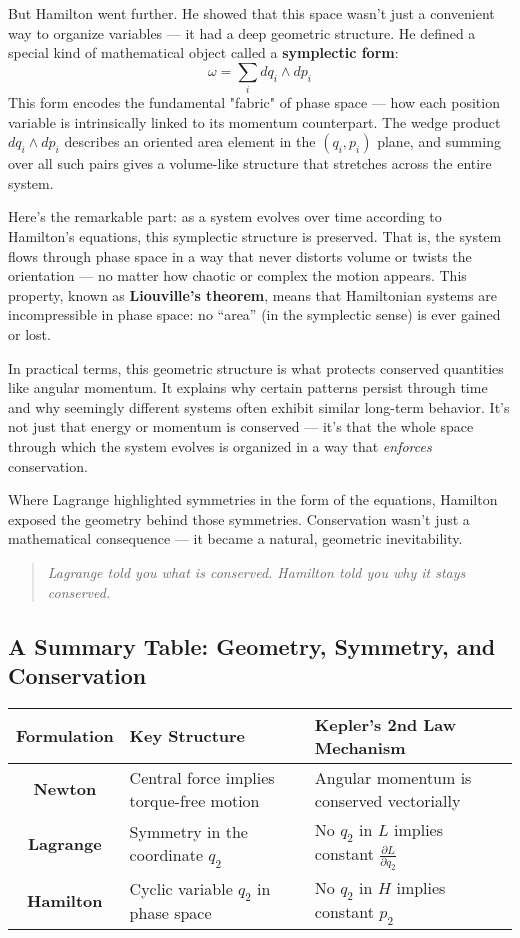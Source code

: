 But Hamilton went further. He showed that this space wasn’t just a convenient way to organize variables — it had a deep geometric structure. He defined a special kind of mathematical object called a \textbf{symplectic form}:
\[
\omega = \sum_i dq_i \wedge dp_i
\]
This form encodes the fundamental "fabric" of phase space — how each position variable is intrinsically linked to its momentum counterpart. The wedge product \( dq_i \wedge dp_i \) describes an oriented area element in the \( (q_i, p_i) \) plane, and summing over all such pairs gives a volume-like structure that stretches across the entire system.

Here’s the remarkable part: as a system evolves over time according to Hamilton’s equations, this symplectic structure is preserved. That is, the system flows through phase space in a way that never distorts volume or twists the orientation — no matter how chaotic or complex the motion appears. This property, known as \textbf{Liouville’s theorem}, means that Hamiltonian systems are incompressible in phase space: no “area” (in the symplectic sense) is ever gained or lost.

In practical terms, this geometric structure is what protects conserved quantities like angular momentum. It explains why certain patterns persist through time and why seemingly different systems often exhibit similar long-term behavior. It’s not just that energy or momentum is conserved — it’s that the whole space through which the system evolves is organized in a way that \textit{enforces} conservation.

Where Lagrange highlighted symmetries in the form of the equations, Hamilton exposed the geometry behind those symmetries. Conservation wasn’t just a mathematical consequence — it became a natural, geometric inevitability.

\begin{quote}
\textit{Lagrange told you what is conserved. Hamilton told you why it stays conserved.}
\end{quote}


\subsection{A Summary Table: Geometry, Symmetry, and Conservation}

\begin{center}
\renewcommand{\arraystretch}{1.5}
\begin{tabular}{|c|l|l|}
\hline
\textbf{Formulation} & \textbf{Key Structure} & \textbf{Kepler’s 2nd Law Mechanism} \\ \hline
\textbf{Newton} & Central force implies torque-free motion & Angular momentum is conserved vectorially \\ \hline
\textbf{Lagrange} & Symmetry in the coordinate \( q_2 \) & No \( q_2 \) in \( L \) implies constant \( \frac{\partial L}{\partial \dot{q}_2} \) \\ \hline
\textbf{Hamilton} & Cyclic variable \( q_2 \) in phase space & No \( q_2 \) in \( H \) implies constant \( p_2 \) \\ \hline
\end{tabular}
\end{center}


